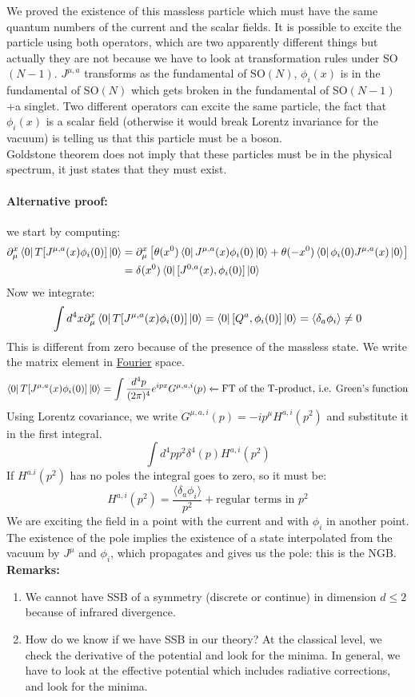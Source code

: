 \documentclass[../main.tex]{subfiles}
\begin{document}
We proved the existence of this massless particle which must have the same quantum numbers of the current and the scalar fields. It is possible to excite the particle using both operators, which are two apparently different things but actually they are not because we have to look at transformation rules under SO$(N-1)$. $J^{\mu,a}$ transforms as the fundamental of SO$(N)$, $\phi_i(x)$ is in the fundamental of SO$(N)$ which gets broken in the fundamental of SO$(N-1)$+a singlet. Two different operators can excite the same particle, the fact that $\phi_i(x)$ is a scalar field (otherwise it would break Lorentz invariance for the vacuum) is telling us that this particle must be a boson. \\
Goldstone theorem does not imply that these particles must be in the physical spectrum, it just states that they must exist.
\paragraph{Alternative proof:}
we start by computing:
\begin{align*}
\partial_\mu^x\bra{0}T[J^{\mu,a}(x)\phi_i(0)]\ket{0}&=\partial_\mu^x\left[\theta(x^0)\bra{0}J^{\mu,a}(x)\phi_i(0)\ket{0}+\theta(-x^0)\bra{0}\phi_i(0)J^{\mu,a}(x)\ket{0}\right]\\
&=\delta(x^0)\bra{0}[J^{0,a}(x),\phi_i(0)]\ket{0}
\end{align*}
Now we integrate:
\[
\int d^4x\partial_\mu^x\bra{0}T[J^{\mu,a}(x)\phi_i(0)]\ket{0}=\bra{0}[Q^a,\phi_i(0)]\ket{0}=\langle\delta_a\phi_i\rangle\neq0
\]
This is different from zero because of the presence of the massless state. We write the matrix element in \href{https://en.wikipedia.org/wiki/Joseph_Fourier}{Fourier} space.
\[
\bra{0}T[J^{\mu,a}(x)\phi_i(0)]\ket{0}=\int\frac{d^4p}{(2\pi)^4}e^{ipx}G^{\mu,a,i}(p)\xleftarrow[]{}\text{FT of the T-product, i.e. Green's function}
\]
Using Lorentz covariance, we write $G^{\mu,a,i}(p)=-ip^\mu H^{a,i}(p^2)$ and substitute it in the first integral.
\[
\int d^4pp^2\delta^4(p)H^{a,i}(p^2)
\]
If $H^{a.i}(p^2)$ has no poles the integral goes to zero, so it must be:
\[
H^{a,i}(p^2)=\frac{\langle\delta_a\phi_i\rangle}{p^2}+\text{regular terms in $p^2$}
\]
We are exciting the field in a point with the current and with $\phi_i$ in another point. The existence of the pole implies the existence of a state interpolated from the vacuum by $J^\mu$ and $\phi_i$, which propagates and gives us the pole: this is the NGB.\\

\textbf{Remarks:}
\begin{enumerate}
    \item We cannot have SSB of a symmetry (discrete or continue) in dimension $d\le2$ because of infrared divergence.
    \item How do we know if we have SSB in our theory? At the classical level, we check the derivative of the potential and look for the minima. In general, we have to look at the effective potential which includes radiative corrections, and look for the minima.
\end{enumerate}
\end{document}
